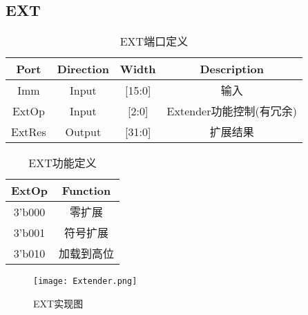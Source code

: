 \documentclass[UTF8]{ctexart}
\begin{document}
\subsection{EXT}
\begin{table}[H]
	\centering
	\begin{threeparttable}
		\caption{EXT端口定义}
		\begin{tabular}{cccc}
			\toprule
			\rowcolor{mypink}
			\textbf{Port} & \textbf{Direction} & \textbf{Width} & \textbf{Description}     \\
			\midrule
			Imm           & Input              & [15:0]         & 输入                     \\
			\midrule
			ExtOp         & Input              & [2:0]          & Extender功能控制(有冗余) \\
			\midrule
			ExtRes        & Output             & [31:0]         & 扩展结果                 \\
			\midrule
		\end{tabular}
	\end{threeparttable}
\end{table}
\begin{table}[H]
	\centering
	\begin{threeparttable}
		\caption{EXT功能定义}
		\begin{tabular}{cc}
			\toprule
			\rowcolor{mypink}
			\textbf{ExtOp} & \textbf{Function} \\
			\midrule
			3'b000         & 零扩展            \\
			\midrule
			3'b001         & 符号扩展          \\
			\midrule
			3'b010         & 加载到高位        \\
			\midrule
		\end{tabular}
	\end{threeparttable}
\end{table}
\begin{figure}[H]
	\centering
	\texttt{[image: Extender.png]}
	\caption{EXT实现图}
\end{figure}
\newpage
\end{document}
